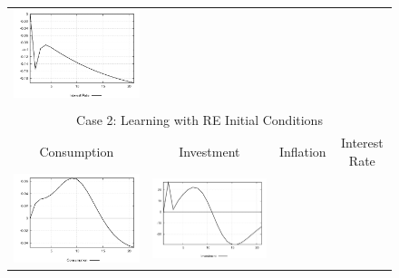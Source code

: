 \begin{figure}
\begin{tabular}{cccc}
\includegraphics[scale=0.22]{results_re/Interest_Rate_techshock_irf.png} \\ \\ 
\multicolumn{4}{c}{Case 2: Learning with RE Initial Conditions}\\
Consumption & Investment & Inflation & Interest Rate \\ 
\includegraphics[scale=0.22]{results_reallinit/Consumption_techshock_irf.png} & 
\includegraphics[scale=0.22]{results_reallinit/Investment_techshock_irf.png} & 

\end{tabular}
\end{figure}
